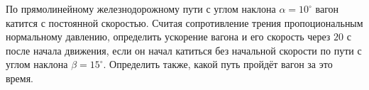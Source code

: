 По прямолинейному железнодорожному пути с углом наклона
$\alpha=10^{\circ}$ вагон катится с постоянной скоростью.
Считая сопротивление трения пропоциональным нормальному давлению,
определить ускорение вагона и его скорость через $20$ с после начала
движения, если он начал катиться без начальной скорости по пути
с углом наклона $\beta=15^{\circ}$. Определить также, какой путь пройдёт
вагон за это время.
